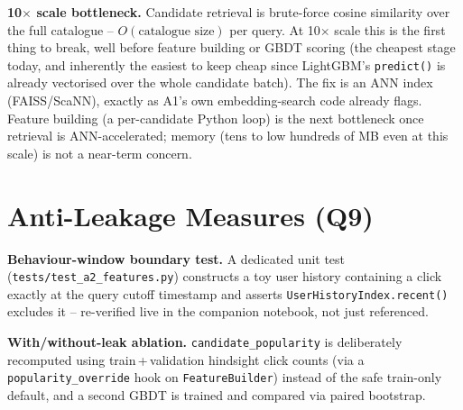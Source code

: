 \documentclass[11pt,a4paper]{article}
\begin{document}
\textbf{10$\times$ scale bottleneck.} Candidate retrieval is brute-force cosine
similarity over the full catalogue -- $O(\text{catalogue size})$ per query. At 10$\times$
scale this is the first thing to break, well before feature building or GBDT scoring
(the cheapest stage today, and inherently the easiest to keep cheap since LightGBM's
\texttt{predict()} is already vectorised over the whole candidate batch). The fix is an
ANN index (FAISS/ScaNN), exactly as A1's own embedding-search code already flags. Feature
building (a per-candidate Python loop) is the next bottleneck once retrieval is
ANN-accelerated; memory (tens to low hundreds of MB even at this scale) is not a
near-term concern.

\section{Anti-Leakage Measures (Q9)}

\textbf{Behaviour-window boundary test.} A dedicated unit test
(\texttt{tests/}\allowbreak\texttt{test\_a2\_features.py}) constructs a toy user history containing a click
exactly at the query cutoff timestamp and asserts \texttt{UserHistoryIndex.recent()}
excludes it -- re-verified live in the companion notebook, not just referenced.

\textbf{With/without-leak ablation.} \texttt{candidate\_popularity} is deliberately
recomputed using train\,+\,validation hindsight click counts (via a
\texttt{popularity\_override} hook on \texttt{FeatureBuilder}) instead of the safe
train-only default, and a second GBDT is trained and compared via paired bootstrap.
\end{document}
